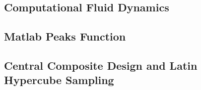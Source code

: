 \documentclass{article}
\begin{document}
\pagebreak
\subsection {Computational Fluid Dynamics}

\begin{figure}[htbp]
  \centering
  \begin{bigbox}
	\begin{small}
	
 	\end{small}
  \end{bigbox}
   \label{fig:cfd}
\end{figure}

\pagebreak
\subsection {Matlab Peaks Function}

\begin{figure}[htbp]
  \centering
  \begin{bigbox}
	\begin{small}
	
 	\end{small}
  \end{bigbox}
   \label{fig:peaks}
\end{figure}

\pagebreak
\subsection {Central Composite Design and Latin Hypercube Sampling}

\begin{figure}[htbp]
  \centering
  \begin{bigbox}
	\begin{small}
	
 	\end{small}
  \end{bigbox}
   \label{fig:ccd_lhs}
\end{figure}
\end{document}
